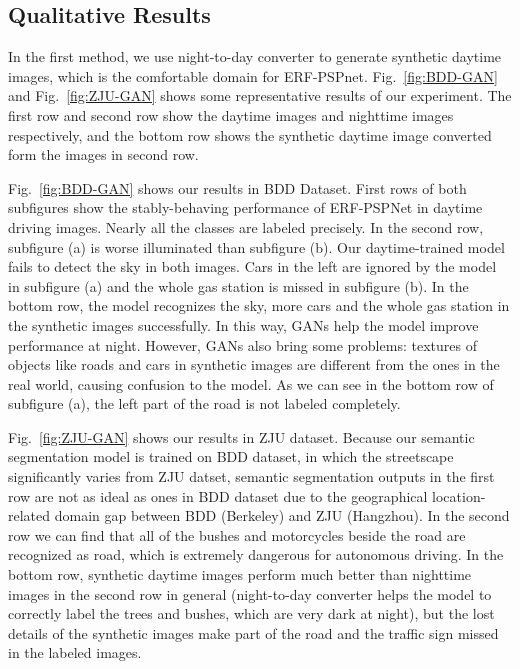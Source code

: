 \documentclass[a4paper]{spie}
\begin{document}
\subsection{Qualitative Results}

In the first method, we use night-to-day converter to generate synthetic daytime images, which is the comfortable domain for ERF-PSPnet. Fig.~\ref{fig:BDD-GAN} and Fig.~\ref{fig:ZJU-GAN} shows some representative results of our experiment. The first row and second row show the daytime images and nighttime images respectively, and the bottom row shows the synthetic daytime image converted form the images in second row.

Fig.~\ref{fig:BDD-GAN} shows our results in BDD Dataset. First rows of both subfigures show the stably-behaving performance of ERF-PSPNet in daytime driving images. Nearly all the classes are labeled precisely. In the second row, subfigure (a) is worse illuminated than subfigure (b). Our daytime-trained model fails to detect the sky in both images. Cars in the left are ignored by the model in subfigure (a) and the whole gas station is missed in subfigure (b). In the bottom row, the model recognizes the sky, more cars and the whole gas station in the synthetic images successfully. In this way, GANs help the model improve performance at night. However, GANs also bring some problems: textures of objects like roads and cars in synthetic images are different from the ones in the real world, causing confusion to the model. As we can see in the bottom row of subfigure (a), the left part of the road is not labeled completely.

Fig.~\ref{fig:ZJU-GAN} shows our results in ZJU dataset. Because our semantic segmentation model is trained on BDD dataset, in which the streetscape significantly varies from ZJU datset, semantic segmentation outputs in the first row are not as ideal as ones in BDD dataset due to the geographical location-related domain gap between BDD (Berkeley) and ZJU (Hangzhou). In the second row we can find that all of the bushes and motorcycles beside the road are recognized as road, which is extremely dangerous for autonomous driving. In the bottom row, synthetic daytime images perform much better than nighttime images in the second row in general (night-to-day converter helps the model to correctly label the trees and bushes, which are very dark at night), but the lost details of the synthetic images make part of the road and the traffic sign missed in the labeled images.
\end{document}
